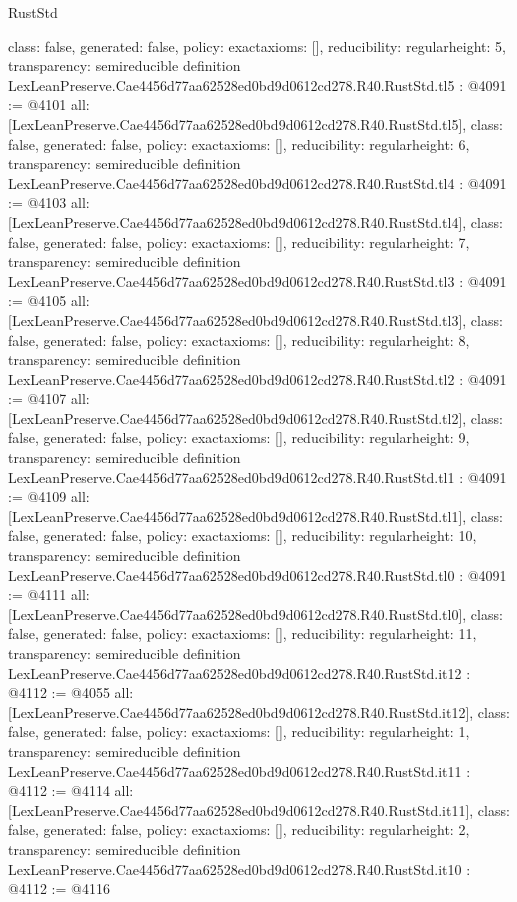 \begin{lexlean}{RustStd}
\begin{coremodule}
{  class: false,
  generated: false,
  policy: exact{axioms: []},
  reducibility: regular{height: 5},
  transparency: semireducible
}
definition LexLeanPreserve.Cae4456d77aa62528ed0bd9d0612cd278.R40.RustStd.tl5 : @4091 := @4101 {
  all: [LexLeanPreserve.Cae4456d77aa62528ed0bd9d0612cd278.R40.RustStd.tl5],
  class: false,
  generated: false,
  policy: exact{axioms: []},
  reducibility: regular{height: 6},
  transparency: semireducible
}
definition LexLeanPreserve.Cae4456d77aa62528ed0bd9d0612cd278.R40.RustStd.tl4 : @4091 := @4103 {
  all: [LexLeanPreserve.Cae4456d77aa62528ed0bd9d0612cd278.R40.RustStd.tl4],
  class: false,
  generated: false,
  policy: exact{axioms: []},
  reducibility: regular{height: 7},
  transparency: semireducible
}
definition LexLeanPreserve.Cae4456d77aa62528ed0bd9d0612cd278.R40.RustStd.tl3 : @4091 := @4105 {
  all: [LexLeanPreserve.Cae4456d77aa62528ed0bd9d0612cd278.R40.RustStd.tl3],
  class: false,
  generated: false,
  policy: exact{axioms: []},
  reducibility: regular{height: 8},
  transparency: semireducible
}
definition LexLeanPreserve.Cae4456d77aa62528ed0bd9d0612cd278.R40.RustStd.tl2 : @4091 := @4107 {
  all: [LexLeanPreserve.Cae4456d77aa62528ed0bd9d0612cd278.R40.RustStd.tl2],
  class: false,
  generated: false,
  policy: exact{axioms: []},
  reducibility: regular{height: 9},
  transparency: semireducible
}
definition LexLeanPreserve.Cae4456d77aa62528ed0bd9d0612cd278.R40.RustStd.tl1 : @4091 := @4109 {
  all: [LexLeanPreserve.Cae4456d77aa62528ed0bd9d0612cd278.R40.RustStd.tl1],
  class: false,
  generated: false,
  policy: exact{axioms: []},
  reducibility: regular{height: 10},
  transparency: semireducible
}
definition LexLeanPreserve.Cae4456d77aa62528ed0bd9d0612cd278.R40.RustStd.tl0 : @4091 := @4111 {
  all: [LexLeanPreserve.Cae4456d77aa62528ed0bd9d0612cd278.R40.RustStd.tl0],
  class: false,
  generated: false,
  policy: exact{axioms: []},
  reducibility: regular{height: 11},
  transparency: semireducible
}
definition LexLeanPreserve.Cae4456d77aa62528ed0bd9d0612cd278.R40.RustStd.it12 : @4112 := @4055 {
  all: [LexLeanPreserve.Cae4456d77aa62528ed0bd9d0612cd278.R40.RustStd.it12],
  class: false,
  generated: false,
  policy: exact{axioms: []},
  reducibility: regular{height: 1},
  transparency: semireducible
}
definition LexLeanPreserve.Cae4456d77aa62528ed0bd9d0612cd278.R40.RustStd.it11 : @4112 := @4114 {
  all: [LexLeanPreserve.Cae4456d77aa62528ed0bd9d0612cd278.R40.RustStd.it11],
  class: false,
  generated: false,
  policy: exact{axioms: []},
  reducibility: regular{height: 2},
  transparency: semireducible
}
definition LexLeanPreserve.Cae4456d77aa62528ed0bd9d0612cd278.R40.RustStd.it10 : @4112 := @4116 {
}
\end{coremodule}
\end{lexlean}
